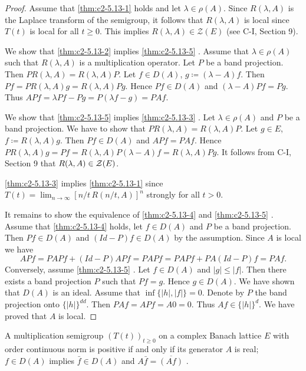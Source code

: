 \begin{proof}
Assume that \ref{thm:c2-5.13-1}   holds and let $\lambda \in \rho(A)$.
Since $R(\lambda,A)$ is the Laplace transform of the semigroup, it follows that $R(\lambda,A)$ is local since $T(t)$ is local for all $t \geq 0$.
This implies $R(\lambda,A) \in \mathcal{Z}(E)$ (see C-I, Section 9).

We show that \ref{thm:c2-5.13-2}   implies \ref{thm:c2-5.13-5}  .
Assume that $\lambda \in \rho(A)$ such that $R(\lambda,A)$ is a multiplication operator.
Let $P$ be a band projection.
Then $PR(\lambda,A) = R(\lambda,A)P$.
Let $f \in D(A)$, $g \coloneqq (\lambda-A)f$.
Then $Pf = PR(\lambda,A)g = R(\lambda,A)Pg$.
Hence $Pf \in D(A)$ and $(\lambda-A)Pf = Pg$.
Thus $APf= \lambda Pf - Pg = P(\lambda f - g) = PAf$.

We show that \ref{thm:c2-5.13-5}   implies \ref{thm:c2-5.13-3}  .
Let $\lambda \in \rho(A)$ and $P$ be a band projection.
We have to show that $PR(\lambda,A) = R(\lambda,A)P$.
Let $g \in E$, $f \coloneqq R(\lambda,A)g$.
Then $Pf \in D(A)$ and $APf = PAf$.
Hence $PR(\lambda,A)g = Pf = R(\lambda,A)P(\lambda-A)f = R(\lambda,A)Pg$.
It follows from C-I, Section 9 
that $R(\lambda,A) \in \mathcal{Z}(E)$.

 \ref{thm:c2-5.13-3}   implies  \ref{thm:c2-5.13-1}   since $T(t) = \lim_{n \to \infty} [n/t\,R(n/t,A)]^{n}$ strongly for all $t > 0$.

It remains to show the equivalence of  \ref{thm:c2-5.13-4}   and  \ref{thm:c2-5.13-5}  .
Assume that  \ref{thm:c2-5.13-4}   holds, let $f \in D(A)$ and $P$ be a band projection.
Then $Pf \in D(A)$ and $(Id-P)f \in D(A)$ by the assumption.
Since $A$ is local we have 
\[
APf = PAPf + (Id-P)APf = PAPf = PAPf + PA(Id-P)f = PAf.
\]
Conversely, assume  \ref{thm:c2-5.13-5}  .
Let $f \in D(A)$ and $|g| \leq |f|$.
Then there exists a band projection $P$ such that $Pf = g$.
Hence $g \in D(A)$.
We have shown
that $D(A)$ is an ideal.
Assume that $\inf\{|h|,|f|\} = 0$.
Denote by $P$ the band projection onto $\{|h|\}^{dd}$.
Then $PAf = APf = A0 = 0$.
Thus $Af \in \{|h|\}^{d}$.
We have proved that $A$ is local.
\end{proof}


\begin{corollary}\label{cor:c2-5.14}
A multiplication semigroup $(T(t))_{t \geq 0}$ on a complex Banach lattice $E$ with order continuous norm is positive if and only if its generator $A$ is real; \ie $f \in D(A)$ implies $\bar{f} \in D(A)$ and $A\bar{f} = \overline{(Af)}$ .
\end{corollary}

